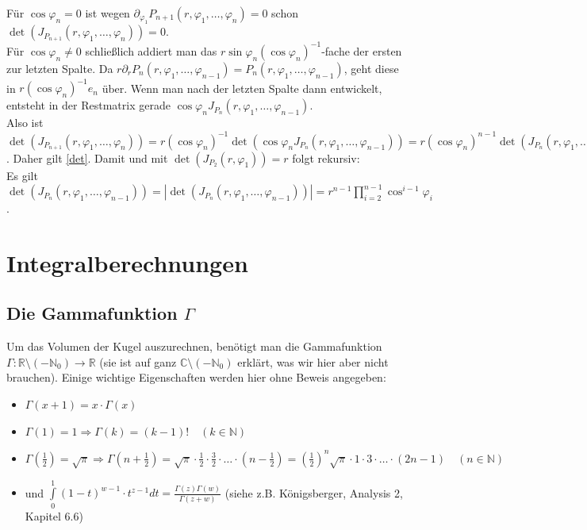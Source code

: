 \documentclass[a4paper,11pt]{scrartcl}
\newcommand{\R}{{\ensuremath{\mathbb{R}}}}
\newcommand{\N}{{\ensuremath{\mathbb{N}}}}
\newcommand{\C}{{\ensuremath{\mathbb{C}}}}
\begin{document}
Für $\cos\varphi_n=0$ ist wegen $\partial_{\varphi_1}P_{n+1}(r,\varphi_1,\ldots,\varphi_n)=0$ schon $\det(J_{P_{n+1}}(r,\varphi_1,\ldots,\varphi_n))=0$.\\
Für $\cos\varphi_n\neq 0$ schließlich addiert man das $r\sin\varphi_n(\cos\varphi_n)^{-1}$-fache der ersten zur letzten Spalte. Da $r\partial_r P_n(r,\varphi_1,\ldots,\varphi_{n-1})=P_n(r,\varphi_1,\ldots,\varphi_{n-1})$, geht diese in $r(\cos\varphi_n)^{-1}e_n$ über. Wenn man nach der letzten Spalte dann entwickelt, entsteht in der Restmatrix gerade $\cos\varphi_n J_{P_n}(r,\varphi_1,\ldots,\varphi_{n-1})$.\\
Also ist $\det(J_{P_{n+1}}(r,\varphi_1,\ldots,\varphi_n))=r(\cos\varphi_n)^{-1}\det(\cos\varphi_n J_{P_n}(r,\varphi_1,\ldots,\varphi_{n-1})) = r(\cos\varphi_n)^{n-1}\det(J_{P_n}(r,\varphi_1,\ldots,\varphi_{n-1}))$. Daher gilt \eqref{det}.
Damit und mit $\det(J_{P_2}(r, \varphi_1))=r$ folgt rekursiv:\\
Es gilt $\det(J_{P_n}(r,\varphi_1,\ldots,\varphi_{n-1}))=|\det(J_{P_n}(r,\varphi_1,\ldots,\varphi_{n-1}))|=r^{n-1}\prod\limits_{i=2}^{n-1}\cos^{i-1}\varphi_i$.
\section{Integralberechnungen}
\subsection{Die Gammafunktion $\Gamma$}
Um das Volumen der Kugel auszurechnen, benötigt man die Gammafunktion \\$\Gamma:\R\setminus(-\N_0)\to\R$ (sie ist auf ganz $\C\setminus(-\N_0)$ erklärt, was wir hier aber nicht brauchen). Einige wichtige Eigenschaften werden hier ohne Beweis angegeben:
\begin{itemize}
\item $\Gamma(x+1)=x\cdot\Gamma(x)$
\item $\Gamma(1)=1\Rightarrow\Gamma(k)=(k-1)!\quad (k\in\N)$
\item $\Gamma(\frac{1}{2})=\sqrt{\pi}\Rightarrow\Gamma(n+\frac{1}{2})=\sqrt{\pi}\cdot\frac{1}{2}\cdot\frac{3}{2}\cdot\ldots\cdot (n-\frac{1}{2})=\left(\frac{1}{2}\right)^n\sqrt{\pi}\cdot 1\cdot 3\cdot\ldots\cdot (2n-1)\quad (n\in\N)$
\item und $\int\limits_0^1 (1-t)^{w-1}\cdot t^{z-1}dt=\frac{\Gamma(z)\Gamma(w)}{\Gamma(z+w)}$ (siehe z.B. Königsberger, Analysis 2, Kapitel 6.6)
\end{itemize}
\end{document}
